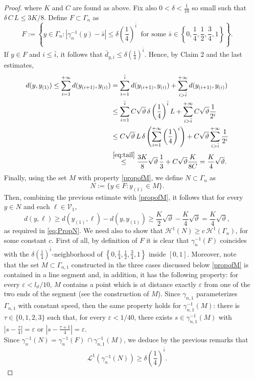 \documentclass[12pt]{amsart}
\newcommand{\eps}{\epsilon}
\renewcommand{\epsilon}{\varepsilon}
\renewcommand{\theta}{\vartheta}
\numberwithin{equation}{section}
\theoremstyle{plain}
\theoremstyle{definition}
\theoremstyle{remark}
\begin{document}
\begin{proof}
 where $K$ and $C$ are found as above. Fix also $0<\delta<\frac{1}{10}$ so small such that $\delta\, C\,L\leq 3K/8$.
 Define $F\subset \Gamma_n$ as 
 \[F:=\left\{y\in\Gamma_n: |\gamma_n^{-1}(y)-\bar s|\leq \delta\left(\frac{1}{4}\right)^{\bar i}\;\;\text{for some }\bar s\in\left\{0,\frac{1}{4},\frac{1}{2},\frac{3}{4},1\right\}\right\}.\]
If $y\in F$ and $i\leq \bar i$, it follows that $\bar d_{y,i}\leq \delta\left(\frac{1}{4}\right)^{\bar i}$. Hence, by Claim 2 and the last estimates,
 \[\begin{split} d(y, y_{(1)})\leq \sum_{i=1}^{+\infty}d(y_{(i+1)}, y_{(i)})&=\sum_{i=1}^{\bar i}d(y_{(i+1)}, y_{(i)})+ \sum_{i>\bar i}^{+\infty}d(y_{(i+1)}, y_{(i)})\\ &\leq \sum_{i=1}^{\bar i}C\sqrt{\theta} \,\delta \left(\frac{1}{4}\right)^{\bar i}L+ \sum_{i>\bar i}^{+\infty}C\sqrt{\theta}\frac{1}{2^i}\\
 &\leq C\sqrt\theta\,L\,\delta\left(\sum_{i=1}^{+\infty}\left(\frac{1}{4}\right)^i\right) + C\sqrt\theta\sum_{i>\bar i}^{+\infty}\frac{1}{2^i}\\ &\overset{\eqref{eq:tail}}{\leq }\frac{3K}{8}\sqrt\theta\,\frac{1}{3}+C\sqrt\theta\frac{K}{8C}=\frac{K}{4} \sqrt\theta.\end{split}\]
 Finally, using the set $M$ with property \eqref{propofM}, we define $N\subset \Gamma_n$ as
 \[N:=\{y\in F: y_{(1)}\in M\}.\]
 Then, combining the previous estimate with \eqref{propofM}, it follows that for every $y\in N$ and each $\ell\in \mathcal V_1$,
 \[d(y,\ell)\geq d(y_{(1)},\ell)-d(y,y_{(1)})\geq \frac{K}{2}\sqrt\theta-\frac{K}{4}\sqrt\theta=\frac{K}{4}\sqrt\theta,\]
 as required in \eqref{eq:PropN}.
 We need also to show that $\mathcal H^1(N)\geq c\,\mathcal H^1(\Gamma _n)$, for some constant $c$.
 First of all, by definition of $F$ it is clear that $\gamma_{n}^{-1}(F)$ coincides with the $\delta\left(\frac{1}{4}\right)^{\bar i}$-neighborhood of $\left\{0,\frac{1}{4},\frac{1}{2},\frac{3}{4},1\right\}$ inside $[0,1]$.
Moreover, note that the set $M\subset \Gamma_{n,1}$ constructed in the three cases discussed below \eqref{propofM} is contained in a line segment %
and, in addition, it has the following property: for every $\epsilon<l_\theta/10$, $M$ contains a point which is at distance exactly $\epsilon$ from one of the two ends of the segment (see the construction of $M$). Since $\gamma_{n,1}$ parameterizes $\Gamma_{n,1}$ with constant speed, then the same property holds for $\gamma_{n,1}^{-1}(M)$: there is $\tau\in\{0,1,2,3\}$ such that, for every $\epsilon<1/40$, there exists $s\in\gamma_{n,1}^{-1}(M)$ with $\left|s-\frac{\tau}{4}\right|=\eps$ or $\left|s-\frac{\tau+1}{4}\right|=\eps$. \medskip\\ Since $\gamma_n^{-1}(N)=\gamma_n^{-1}(F)\,\cap \gamma_{n,1}^{-1}(M)$, we deduce by the previous remarks that \[\mathcal L^1(\gamma_n^{-1}(N))\geq\delta\left(\frac{1}{4}\right)^{\bar i}.\] 

\end{proof}
\end{document}
